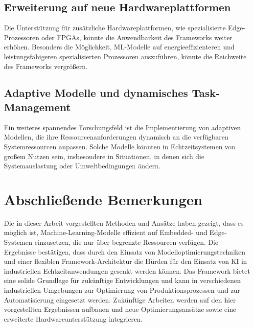 \subsection{Erweiterung auf neue Hardwareplattformen}
Die Unterstützung für zusätzliche Hardwareplattformen, wie spezialisierte Edge-Prozessoren oder FPGAs, könnte die Anwendbarkeit des Frameworks 
weiter erhöhen. Besonders die Möglichkeit, ML-Modelle auf energieeffizienteren und leistungsfähigeren spezialisierten Prozessoren auszuführen, 
könnte die Reichweite des Frameworks vergrößern.

\subsection{Adaptive Modelle und dynamisches Task-Management}
Ein weiteres spannendes Forschungsfeld ist die Implementierung von adaptiven Modellen, die ihre Ressourcenanforderungen dynamisch 
an die verfügbaren Systemressourcen anpassen. Solche Modelle könnten in Echtzeitsystemen von großem Nutzen sein, insbesondere in Situationen, 
in denen sich die Systemauslastung oder Umweltbedingungen ändern.

\section{Abschließende Bemerkungen}
Die in dieser Arbeit vorgestellten Methoden und Ansätze haben gezeigt, dass es möglich ist, Machine-Learning-Modelle effizient auf 
Embedded- und Edge-Systemen einzusetzen, die nur über begrenzte Ressourcen verfügen. Die Ergebnisse bestätigen, dass durch den Einsatz 
von Modelloptimierungstechniken und einer flexiblen Framework-Architektur die Hürden für den Einsatz von KI in industriellen Echtzeitanwendungen 
gesenkt werden können. Das Framework bietet eine solide Grundlage für zukünftige Entwicklungen und kann in verschiedenen industriellen Umgebungen 
zur Optimierung von Produktionsprozessen und zur Automatisierung eingesetzt werden. Zukünftige Arbeiten werden auf den hier vorgestellten Ergebnissen 
aufbauen und neue Optimierungsansätze sowie eine erweiterte Hardwareunterstützung integrieren.